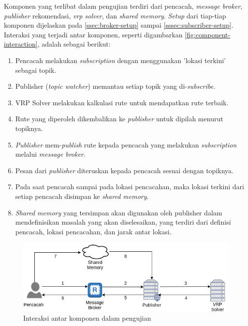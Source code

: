Komponen yang terlibat dalam pengujian terdiri dari pencacah, \textit{message broker}, \textit{publisher} rekomendasi, \textit{vrp solver}, dan \textit{shared memory}. \textit{Setup} dari tiap-tiap komponen dijelaskan pada \autoref{ssec:broker-setup} sampai \autoref{sssec:subscriber-setup}. Interaksi yang terjadi antar komponen, seperti digambarkan \autoref{fig:component-interaction}, adalah sebagai berikut:


\begin{enumerate}
	\item Pencacah melakukan \textit{subscription} dengan menggunakan 'lokasi terkini' sebagai topik.
	\item Publisher (\textit{topic watcher}) memantau setiap topik yang di-\textit{subscribe}.
	\item VRP Solver melakukan kalkulasi rute untuk mendapatkan rute terbaik.
	\item Rute yang diperoleh dikembalikan ke \textit{publisher} untuk dipilah menurut topiknya.
	\item \textit{Publisher} mem-\textit{publish} rute kepada pencacah yang melakukan \textit{subscription} melalui \textit{message broker}.
	\item Pesan dari \textit{publisher} diteruskan kepada pencacah sesuai dengan topiknya.
	\item Pada saat pencacah sampai pada lokasi pencacahan, maka lokasi terkini dari setiap pencacah disimpan ke \textit{shared memory}.
	\item \textit{Shared memory} yang tersimpan akan digunakan oleh publisher dalam mendefinisikan masalah yang akan diselesaikan, yang terdiri dari definisi pencacah, lokasi pencacahan, dan jarak antar lokasi.
\end{enumerate}


\begin{figure}[!]
	\centering
	\includegraphics[width=\textwidth]{Resources/Images/component-interaction}
	\caption{Interaksi antar komponen dalam pengujian}
	\label{fig:component-interaction}
\end{figure}



